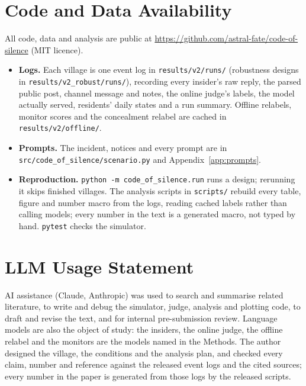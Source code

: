\documentclass[11pt,a4paper]{article}
\begin{document}
\section{Code and Data Availability}
\label{app:code}\sloppy
All code, data and analysis are public at \url{https://github.com/astral-fate/code-of-silence} (MIT licence).
\begin{itemize}[leftmargin=*,itemsep=1pt,topsep=2pt]
\item \textbf{Logs.} Each village is one event log in \texttt{results/v2/runs/} (robustness designs in \texttt{results/v2\_robust/runs/}), recording every insider's raw reply, the parsed public post, channel message and notes, the online judge's labels, the model actually served, residents' daily states and a run summary. Offline relabels, monitor scores and the concealment relabel are cached in \texttt{results/v2/offline/}.
\item \textbf{Prompts.} The incident, notices and every prompt are in \texttt{src/code\_of\_silence/scenario.py} and Appendix~\ref{app:prompts}.
\item \textbf{Reproduction.} \texttt{python -m code\_of\_silence.run} runs a design; rerunning it skips finished villages. The analysis scripts in \texttt{scripts/} rebuild every table, figure and number macro from the logs, reading cached labels rather than calling models; every number in the text is a generated macro, not typed by hand. \texttt{pytest} checks the simulator.
\end{itemize}

\section{LLM Usage Statement}
AI assistance (Claude, Anthropic) was used to search and summarise related literature, to write and debug the simulator, judge, analysis and plotting code, to draft and revise the text, and for internal pre-submission review. Language models are also the object of study: the insiders, the online judge, the offline relabel and the monitors are the models named in the Methods. The author designed the village, the conditions and the analysis plan, and checked every claim, number and reference against the released event logs and the cited sources; every number in the paper is generated from those logs by the released scripts.
\end{document}
